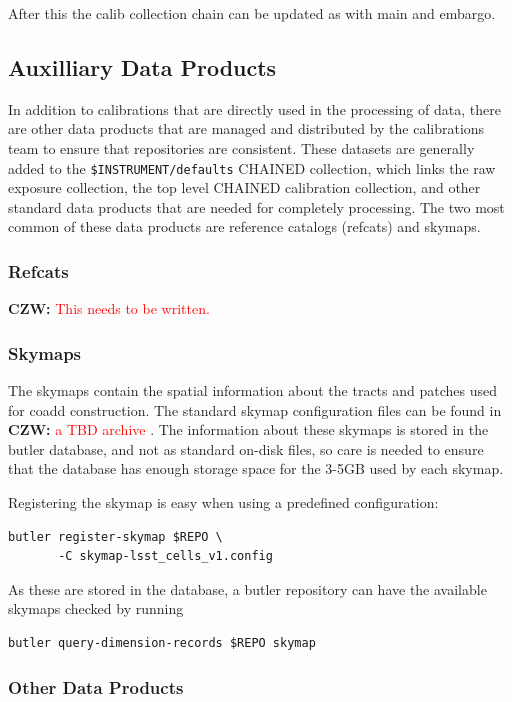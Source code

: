 \documentclass[DM,authoryear,toc]{lsstdoc}
\newcommand{\czw}[1]{
  \textbf{CZW: }\textcolor{red}{#1}
}
\begin{document}
After this the calib collection chain can be updated as with main and embargo.

\subsection{Auxilliary Data Products}

In addition to calibrations that are directly used in the processing of data, there are other data products that are managed and distributed by the calibrations team to ensure that repositories are consistent.
These datasets are generally added to the \verb|$INSTRUMENT/defaults| CHAINED collection, which links the raw exposure collection, the top level CHAINED calibration collection, and other standard data products that are needed for completely processing.
The two most common of these data products are reference catalogs (refcats) and skymaps.

\subsubsection{Refcats}

\czw{This needs to be written.}

\subsubsection{Skymaps}

The skymaps contain the spatial information about the tracts and patches used for coadd construction.
The standard skymap configuration files can be found in \czw{a TBD archive}.
The information about these skymaps is stored in the butler database, and not as standard on-disk files, so care is needed to ensure that the database has enough storage space for the 3-5GB used by each skymap.

Registering the skymap is easy when using a predefined configuration:
\begin{verbatim}
butler register-skymap $REPO \
       -C skymap-lsst_cells_v1.config
\end{verbatim}

As these are stored in the database, a butler repository can have the available skymaps checked by running
\begin{verbatim}
butler query-dimension-records $REPO skymap
\end{verbatim}

\subsubsection{Other Data Products}
\end{document}
